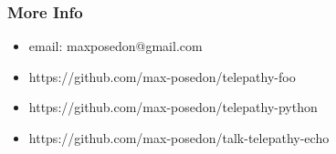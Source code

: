 \documentclass{beamer}
\begin{document}
\begin{frame}[fragile]
    \frametitle{More Info}
    \begin{itemize}
    \item email: maxposedon@gmail.com
    \item https://github.com/max-posedon/telepathy-foo
    \item https://github.com/max-posedon/telepathy-python
    \item https://github.com/max-posedon/talk-telepathy-echo
    \end{itemize}
\end{frame}
\end{document}
